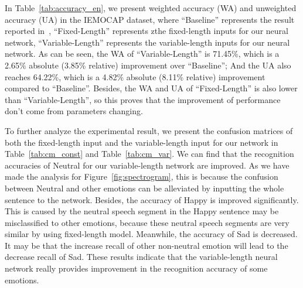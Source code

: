 \documentclass[a4paper]{article}
\begin{document}
In Table~\ref{tab:accuracy_en}, we present weighted accuracy (WA) and unweighted accuracy (UA) in the IEMOCAP dataset, where ``Baseline'' represents the result reported in~\cite{satt2017}, ``Fixed-Length'' represents zthe fixed-length inputs for our neural network, ``Variable-Length'' represents the variable-length inputs for our neural network. As can be seen, the WA of ``Variable-Length'' is 71.45\%, which is a 2.65\% absolute (3.85\% relative) improvement over ``Baseline''; And the UA also reaches 64.22\%, which is a 4.82\% absolute (8.11\% relative) improvement compared to ``Baseline''. Besides, the WA and UA of ``Fixed-Length'' is also lower than ``Variable-Length'', so this proves that the improvement of performance don't come from parameters changing.

To further analyze the experimental result, we present the confusion matrices of both the fixed-length input and the variable-length input for our network in Table~\ref{tab:cm_const} and Table~\ref{tab:cm_var}. We can find that the recognition accuracies of Neutral for our variable-length network are improved. As we have made the analysis for Figure~\ref{fig:spectrogram}, this is because the confusion between Neutral and other emotions can be alleviated by inputting the whole sentence to the network. Besides, the accuracy of Happy is improved significantly. This is caused by the neutral speech segment in the Happy sentence may be misclassified to other emotions, because these neutral speech segments are very similar by using fixed-length model. Meanwhile, the accuracy of Sad is decreased. It may be that the increase recall of other non-neutral emotion will lead to the decrease recall of Sad. These results indicate that the variable-length neural network really provides improvement in the recognition accuracy of some emotions.

\begin{table}[!htb]
\caption{Comparison of weighted accuracy (WA) and unweighted accuracy (UA) on IEMOCAP dataset}
\label{tab:accuracy_en}
\end{table}
\end{document}
